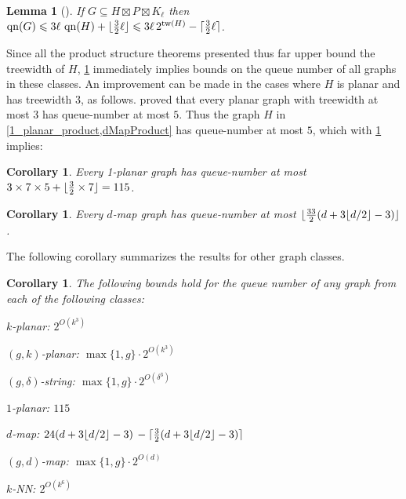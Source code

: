 \documentclass{patmorin}
\theoremstyle{plain}
\newtheorem{lem}[thm]{Lemma}
\newtheorem{cor}[thm]{Corollary}
\theoremstyle{definition}
\newcommand{\note}[2]{\noindent{\color{red}[#1:~#2]}}
\DeclareMathOperator{\tw}{tw}
\DeclareMathOperator{\qn}{qn}
\DeclarePairedDelimiter{\ceil}{\lceil}{\rceil}
\DeclarePairedDelimiter{\floor}{\lfloor}{\rfloor}
\renewcommand{\leq}{\leqslant}
\begin{document}
\begin{lem}[\citep{DJMMUW20}]
\label{qn}
If $G\subseteq H \boxtimes P \boxtimes K_\ell$ then
$\qn(G) \leq  3 \ell \, \qn(H) + \floor{\tfrac{3}{2}\ell}
\leq 3 \ell \, 2^{\tw(H)}  - \ceil{\tfrac{3}{2}\ell}$.
\end{lem}

Since all the product structure theorems presented thus far upper bound the treewidth of $H$,
\cref{qn} immediately implies bounds on the queue number of all graphs in these classes.  An improvement can be made in the cases where $H$ is planar and has treewidth $3$, as follows.
\citet{ABGKP20} proved that every planar graph with treewidth at most $3$ has queue-number at most $5$. Thus the graph $H$ in \cref{1_planar_product,dMapProduct} has queue-number at most $5$, which with \cref{qn} implies:

\begin{cor}
\label{1PlanarQueue}
Every 1-planar graph has queue-number at most 
$3 \times 7 \times 5 + \floor{\tfrac{3}{2} \times 7} = 115$.
\end{cor}

\begin{cor}
\label{dMapQueue}
Every $d$-map graph has queue-number at most 
$\floor{ \frac{33}{2} (d+3\floor{d/2}-3) }$.
\note{DW}{I have updated this bound using the better qn bound for planar 3-trees. Note that with $d=3$ we get the original bound of 49.}
\end{cor}




The following corollary summarizes the results for other graph classes.
\begin{cor}\label{q_cor}
  The following bounds hold for the queue number of any graph from each of the following classes:
  \begin{compactenum}
    \item $k$-planar: $2^{O(k^3)}$
    \item $(g,k)$-planar: $\max\{1,g\}\cdot 2^{O(k^3)}$
    \item $(g,\delta)$-string: $\max\{1,g\}\cdot 2^{O(\delta^3)}$
    \item $1$-planar: $115$ \note{DW}{delete?}
    \item $d$-map: $24 (d+3\floor{d/2}-3) \,  - \ceil{\tfrac{3}{2} (d+3\floor{d/2}-3)}$ \note{DW}{delete?}
    \item $(g,d)$-map: $\max\{1,g\}\cdot 2^{O(d)}$
    \item $k$-NN: $2^{O(k^6)}$
  \end{compactenum}
\end{cor}
\end{document}
